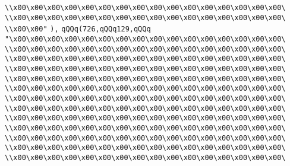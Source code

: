 \verb|\\x00\x00\x00\x00\x00\x00\x00\x00\x00\x00\x00\x00\x00\x00\x00\x00\|\newline
\verb|\\x00\x00\x00\x00\x00\x00\x00\x00\x00\x00\x00\x00\x00\x00\x00\x00\|\newline
\verb|\\x00\x00"|\newline
\verb|),|\newline
\verb|qQQq(726,qQQq129,qQQq|\newline
\verb|"\x00\x00\x00\x00\x00\x00\x00\x00\x00\x00\x00\x00\x00\x00\x00\x00\|\newline
\verb|\\x00\x00\x00\x00\x00\x00\x00\x00\x00\x00\x00\x00\x00\x00\x00\x00\|\newline
\verb|\\x00\x00\x00\x00\x00\x00\x00\x00\x00\x00\x00\x00\x00\x00\x00\x00\|\newline
\verb|\\x00\x00\x00\x00\x00\x00\x00\x00\x00\x00\x00\x00\x00\x00\x00\x00\|\newline
\verb|\\x00\x00\x00\x00\x00\x00\x00\x00\x00\x00\x00\x00\x00\x00\x00\x00\|\newline
\verb|\\x00\x00\x00\x00\x00\x00\x00\x00\x00\x00\x00\x00\x00\x00\x00\x00\|\newline
\verb|\\x00\x00\x00\x00\x00\x00\x00\x00\x00\x00\x00\x00\x00\x00\x00\x00\|\newline
\verb|\\x00\x00\x00\x00\x00\x00\x00\x00\x00\x00\x00\x00\x00\x00\x00\x00\|\newline
\verb|\\x00\x00\x00\x00\x00\x00\x00\x00\x00\x00\x00\x00\x00\x00\x00\x00\|\newline
\verb|\\x00\x00\x00\x00\x00\x00\x00\x00\x00\x00\x00\x00\x00\x00\x00\x00\|\newline
\verb|\\x00\x00\x00\x00\x00\x00\x00\x00\x00\x00\x00\x00\x00\x00\x00\x00\|\newline
\verb|\\x00\x00\x00\x00\x00\x00\x00\x00\x00\x00\x00\x00\x00\x00\x00\x00\|\newline
\verb|\\x00\x00\x00\x00\x00\x00\x00\x00\x00\x00\x00\x00\x00\x00\x00\x00\|\newline
